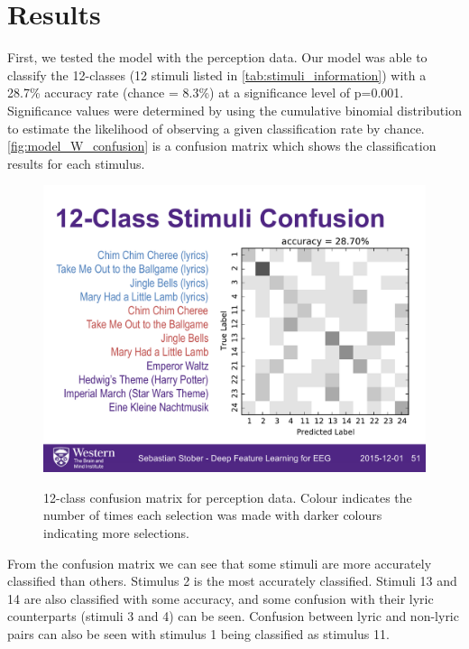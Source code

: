 \section{Results}
First, we tested the model with the perception data. 
Our model was able to classify the 12-classes (12 stimuli listed in \autoref{tab:stimuli_information}) with a 28.7\% accuracy rate (chance = 8.3\%) at a significance level of p=0.001. 
Significance values were determined by using the cumulative binomial distribution to estimate the likelihood of observing a given classification rate by chance. 
\autoref{fig:model_W_confusion} is a confusion matrix which shows the classification results for each stimulus.
\begin{figure}[htb] 
  \begin{center}
    \includegraphics[width=.75\textwidth,keepaspectratio=true]{Figures/model_W_confusion}
   \\\vspace{-0.8em}
    \caption{12-class confusion matrix for perception data. Colour indicates the number of times each selection was made with darker colours indicating more selections.}
    \label{fig:model_W_confusion}
  \end{center}
\end{figure}
From the confusion matrix we can see that some stimuli are more accurately classified than others. 
Stimulus 2 is the most accurately classified. 
Stimuli 13 and 14 are also classified with some accuracy, and some confusion with their lyric counterparts (stimuli 3 and 4) can be seen.
Confusion between lyric and non-lyric pairs can also be seen with stimulus 1 being classified as stimulus 11.

